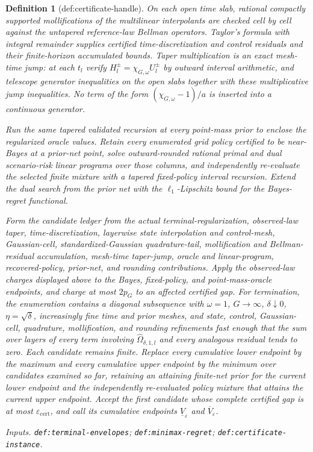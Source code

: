 \documentclass{article}
\newtheorem{definition}{Definition}
\begin{document}
\begin{definition}[def:certificate-handle]
On each open time slab, rational compactly supported mollifications of the multilinear interpolants are checked cell by cell against the untapered reference-law Bellman operators.  Taylor's formula with integral remainder supplies certified time-discretization and control residuals and their finite-horizon accumulated bounds.  Taper multiplication is an exact mesh-time jump: at each \(t_l\) verify \(H_l^\pm=\chi_{G,\omega}U_l^\pm\) by outward interval arithmetic, and telescope generator inequalities on the open slabs together with these multiplicative jump inequalities.  No term of the form \((\chi_{G,\omega}-1)/a\) is inserted into a continuous generator.

Run the same tapered validated recursion at every point-mass prior to enclose the regularized oracle values.  Retain every enumerated grid policy certified to be near-Bayes at a prior-net point, solve outward-rounded rational primal and dual scenario-risk linear programs over those columns, and independently re-evaluate the selected finite mixture with a tapered fixed-policy interval recursion.  Extend the dual search from the prior net with the \(\ell_1\)-Lipschitz bound for the Bayes-regret functional.

Form the candidate ledger from the actual terminal-regularization, observed-law taper, time-discretization, layerwise state interpolation and control-mesh, Gaussian-cell, standardized-Gaussian quadrature-tail, mollification and Bellman-residual accumulation, mesh-time taper-jump, oracle and linear-program, recovered-policy, prior-net, and rounding contributions.  Apply the observed-law charges displayed above to the Bayes, fixed-policy, and point-mass-oracle endpoints, and charge at most \(2p_G\) to an affected certified gap.  For termination, the enumeration contains a diagonal subsequence with \(\omega=1\), \(G\to\infty\), \(\delta\downarrow0\), \(\eta=\sqrt\delta\), increasingly fine time and prior meshes, and state, control, Gaussian-cell, quadrature, mollification, and rounding refinements fast enough that the sum over layers of every term involving \(\widehat\Omega_{\delta,1,l}\) and every analogous residual tends to zero.  Each candidate remains finite.  Replace every cumulative lower endpoint by the maximum and every cumulative upper endpoint by the minimum over candidates examined so far, retaining an attaining finite-net prior for the current lower endpoint and the independently re-evaluated policy mixture that attains the current upper endpoint.  Accept the first candidate whose complete certified gap is at most \(\varepsilon_{\mathrm{cert}}\), and call its cumulative endpoints \(\underline V_{\varepsilon}\) and \(\overline V_{\varepsilon}\).
\par\smallskip\noindent\emph{Inputs.} \texttt{def:\allowbreak{}terminal-\allowbreak{}envelopes}; \texttt{def:\allowbreak{}minimax-\allowbreak{}regret}; \texttt{def:\allowbreak{}certificate-\allowbreak{}instance}.
\end{definition}
\end{document}
